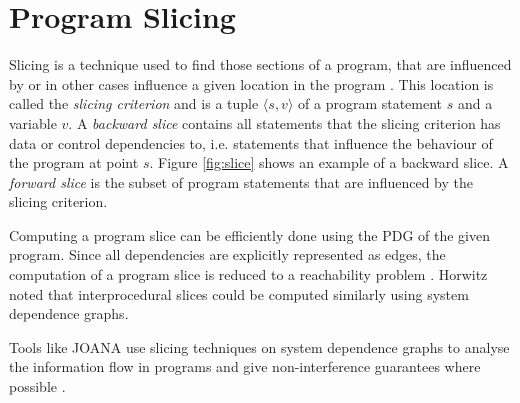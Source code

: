 \section{Program Slicing}
Slicing is a technique used to find those sections of a program, that are influenced by or in other cases influence a given location in the program \cite{weiser81}.
This location is called the \emph{slicing criterion} and is a tuple $\langle s, v \rangle$ of a program statement $s$ and a variable $v$.
A \emph{backward slice} contains all statements that the slicing criterion has data or control dependencies to, i.e. statements that influence the behaviour of the program at point $s$. Figure \ref{fig:slice} shows an example of a backward slice.
A \emph{forward slice} is the subset of program statements that are influenced by the slicing criterion.

Computing a program slice can be efficiently done using the PDG of the given program. Since all dependencies are explicitly represented as edges, the computation of a program slice is reduced to a reachability problem \cite{ottenstein84}. Horwitz \cite{horwitz88sdg} noted that interprocedural slices could be computed similarly using system dependence graphs.

Tools like JOANA use slicing techniques on system dependence graphs to analyse the information flow in programs and give non-interference guarantees where possible \cite{hammer09}.

